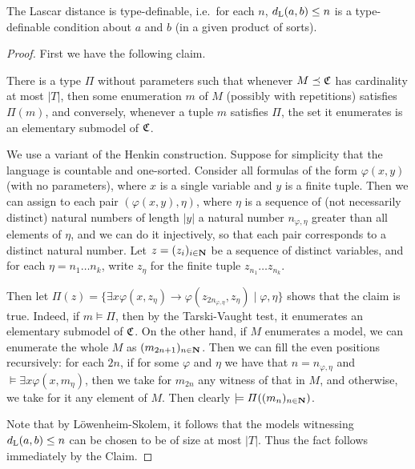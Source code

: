 	\begin{fct}
		\label{fct:distance_tdf}
		The Lascar distance is type-definable, i.e.\ for each $n$, $d_{\mathrm{L}}(a,b)\leq n$ is a type-definable condition about $a$ and $b$ (in a given product of sorts).
	\end{fct}
	\begin{proof}
		First we have the following claim.
		\begin{clm*}
			There is a type $\Pi$ without parameters such that whenever $M\preceq {\mathfrak C}$ has cardinality at most $\lvert T\rvert$, then some enumeration $m$ of $M$ (possibly with repetitions) satisfies $\Pi(m)$, and conversely, whenever a tuple $m$ satisfies $\Pi$, the set it enumerates is an elementary submodel of ${\mathfrak C}$.
		\end{clm*}
		\begin{clmproof}
			We use a variant of the Henkin construction. Suppose for simplicity that the language is countable and one-sorted. Consider all formulas of the form $\varphi(x,y)$ (with no parameters), where $x$ is a single variable and $y$ is a finite tuple. Then we can assign to each pair $(\varphi(x,y),\eta)$, where $\eta$ is a sequence of (not necessarily distinct) natural numbers of length $\lvert y\rvert$ a natural number $n_{\varphi,\eta}$ greater than all elements of $\eta$, and we can do it injectively, so that each pair corresponds to a distinct natural number. Let $z=(z_i)_{i\in {\mathbf{N}}}$ be a sequence of distinct variables, and for each $\eta=n_1\ldots n_k$, write $z_\eta$ for the finite tuple $z_{n_1}\ldots z_{n_k}$.
			
			Then let $\Pi(z)=\{\exists x\varphi(x,z_\eta)\rightarrow \varphi(z_{2n_{\varphi,\eta}},z_\eta)\mid \varphi,\eta \}$ shows that the claim is true. Indeed, if $m\models \Pi$, then by the Tarski-Vaught test, it enumerates an elementary submodel of ${\mathfrak C}$. On the other hand, if $M$ enumerates a model, we can enumerate the whole $M$ as $(m_{2n+1})_{n\in {\mathbf{N}}}$. Then we can fill the even positions recursively: for each $2n$, if for some $\varphi$ and $\eta$ we have that $n=n_{\varphi,\eta}$ and $\models \exists x\varphi(x,m_{\eta})$, then we take for $m_{2n}$ any witness of that in $M$, and otherwise, we take for it any element of $M$. Then clearly $\models \Pi((m_n)_{n\in {\mathbf{N}}})$.
		\end{clmproof}
		Note that by Löwenheim-Skolem, it follows that the models witnessing $d_{\mathrm{L}}(a,b)\leq n$ can be chosen to be of size at most $\lvert T\rvert$. Thus the fact follows immediately by the Claim.
	\end{proof}
	
